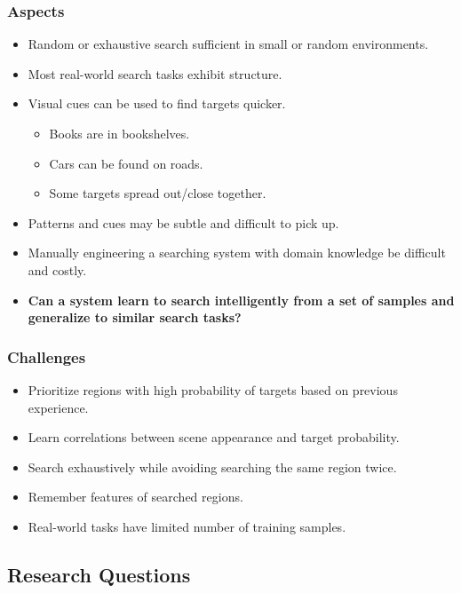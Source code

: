 \begin{frame}
    \frametitle{Aspects}

    \begin{itemize}
        \item Random or exhaustive search sufficient in small or random environments.
        \item Most real-world search tasks exhibit structure.
        \item Visual cues can be used to find targets quicker.
        \begin{itemize}
            \item Books are in bookshelves.
            \item Cars can be found on roads.
            \item Some targets spread out/close together.
        \end{itemize}
        \item Patterns and cues may be subtle and difficult to pick up.
        \item Manually engineering a searching system with domain knowledge be difficult and costly.
        \item \textbf{Can a system learn to search intelligently from a set of samples and generalize to similar search tasks?}
    \end{itemize}
\end{frame}

\begin{frame}
    \frametitle{Challenges}

    \begin{itemize}
        \item Prioritize regions with high probability of targets based on previous experience.
        \item Learn correlations between scene appearance and target probability.
        \item Search exhaustively while avoiding searching the same region twice.
        \item Remember features of searched regions.
        \item Real-world tasks have limited number of training samples.
    \end{itemize}
\end{frame}

\subsection{Research Questions}


